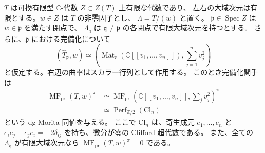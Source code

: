 \begin{lemma}
\label{cmo:lem:isolated-azumaya-mf-completion}
$T$ は可換有限型 $\mathbb C$-代数 $Z\subset Z(T)$ 上有限な代数であり、
左右の大域次元は有限とする。$w\in Z$ は $T$ の非零因子とし、
$\Lambda=T/(w)$ と置く。
$\mathfrak p\in\operatorname{Spec}Z$ は $w\in\mathfrak p$ を満たす閉点で、
$\Lambda_{\mathfrak q}$ は $\mathfrak q\ne\mathfrak p$ の各閉点で有限大域次元を持つとする。
さらに、$\mathfrak p$ における完備化について
\[
 (\widehat T_{\mathfrak p},w)
 \simeq
 \left(\operatorname{Mat}_r(\mathbb C[[v_1,\ldots,v_n]]),
             \sum_{j=1}^n v_j^2\right)
\]
と仮定する。右辺の曲率はスカラー行列として作用する。
このとき完備化関手は
\[
 \begin{aligned}
 \operatorname{MF}_{\mathrm{pr}}(T,w)^\pi
 &\simeq
 \operatorname{MF}_{\mathrm{pr}}
   (\mathbb C[[v_1,\ldots,v_n]],\sum_jv_j^2)^\pi\\
 &\simeq \operatorname{Perf}_{\mathbb Z/2}(\mathrm{Cl}_n)
 \end{aligned}
\]
という dg Morita 同値を与える。
ここで $\mathrm{Cl}_n$ は、奇生成元 $e_1,\ldots,e_n$ と
$e_ie_j+e_je_i=-2\delta_{ij}$ を持ち、微分が零の Clifford 超代数である。
また、全ての $\Lambda_{\mathfrak q}$ が有限大域次元なら
$\operatorname{MF}_{\mathrm{pr}}(T,w)^\pi=0$ である。
\end{lemma}

